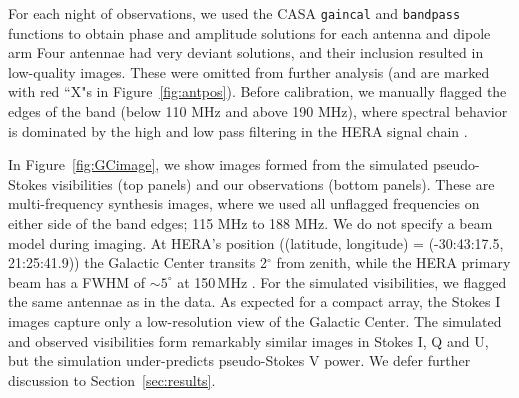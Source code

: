\documentclass[twocolumn, trackchanges]{aastex61}
\begin{document}
For each night of observations, we used the {\sc CASA} {\tt gaincal} and {\tt bandpass} functions to obtain  phase and amplitude solutions for each antenna and dipole arm  Four antennae had very deviant solutions, and their inclusion resulted in low-quality images. These were omitted from further analysis (and are marked with red ``X"s in Figure~\ref{fig:antpos}).  Before calibration, we manually flagged the edges of the band (below 110 MHz and above 190 MHz), where spectral behavior is dominated by the high and low pass filtering in the HERA signal chain \citep{deBoer17}.

In Figure~\ref{fig:GCimage}, we show images formed from the simulated pseudo-Stokes visibilities (top panels) and our observations (bottom panels). These are multi-frequency synthesis images, where we used all unflagged frequencies on either side of the band edges; 115 MHz to 188 MHz. We do not specify a beam model during imaging.  At HERA's position ((latitude, longitude) = (-30:43:17.5, 21:25:41.9)) the Galactic Center transits 2$^{\circ}$ from zenith, while the HERA primary beam has a FWHM of $\sim5^{\circ}$ at 150\,MHz \citep{Neben.16}. For the simulated visibilities, we flagged the same antennae as in the data. As expected for a compact array, the Stokes I images capture only a low-resolution view of the Galactic Center. The simulated and observed visibilities form remarkably similar images in Stokes I, Q and U, but the simulation under-predicts pseudo-Stokes V power. We defer further discussion to Section~\ref{sec:results}.
\end{document}
